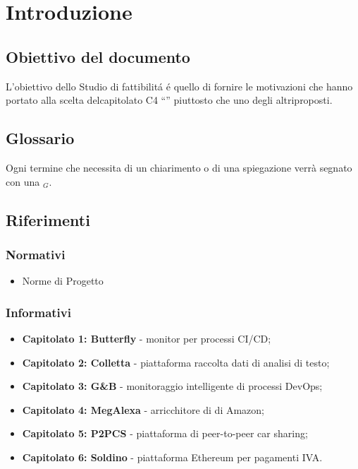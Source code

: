 \chapter{Introduzione}
\section{Obiettivo del documento}
L’obiettivo dello Studio di fattibilit\'a \'e quello di fornire le motivazioni che hanno portato alla scelta delcapitolato C4 “” piuttosto che uno degli altriproposti.
\section{Glossario} 
Ogni termine che necessita di un chiarimento o di una spiegazione verrà segnato con una $_{G}$.
\section{Riferimenti}
\subsection{Normativi}
\begin{itemize}
	\item Norme di Progetto
\end{itemize}
\subsection{Informativi}
\begin{itemize}
\item \textbf{Capitolato 1: Butterfly} - monitor per processi CI/CD;
\item \textbf{Capitolato 2: Colletta} - piattaforma raccolta dati di analisi di testo;
\item \textbf{Capitolato 3: G\&B} - monitoraggio intelligente di processi DevOps;
\item \textbf{Capitolato 4: MegAlexa} - arricchitore di di Amazon;
\item \textbf{Capitolato 5: P2PCS} - piattaforma di peer-to-peer car sharing;
\item \textbf{Capitolato 6: Soldino} - piattaforma Ethereum per pagamenti IVA.

\end{itemize}
